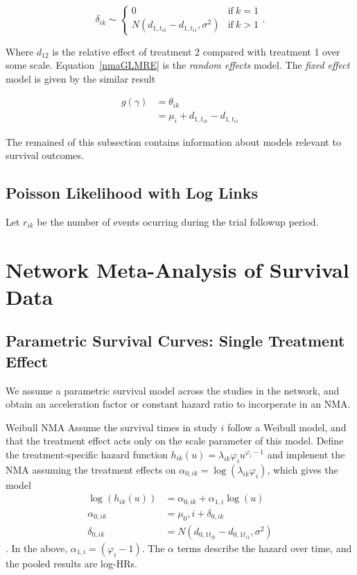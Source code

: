 \[
    \delta_{ik} \sim \begin{cases}
        0 & \text{if} \ k = 1 \\ 
        N(d_{1,t_{ik}} - d_{1,t_{i1}}, \sigma^2) & \text{if} \ k > 1
    \end{cases}.  
\]

Where $d_{12}$ is the relative effect of treatment 2 compared with treatment 1 over some scale. Equation~\ref{nmaGLMRE} is the \textit{random effects} model. The \textit{fixed effect} model is given by the similar result

\begin{align}
    g(\gamma) &= \theta_{ik} \\
              &= \mu_i + d_{1,t_{ik}} - d_{1,t_{i1}}   
\end{align}

The remained of this subsection contains information about models relevant to survival outcomes.

\subsection{Poisson Likelihood with Log Links}
Let $r_{ik}$ be the number of events ocurring during the trial followup period.

\section{Network Meta-Analysis of Survival Data}

\subsection{Parametric Survival Curves: Single Treatment Effect}
We assume a parametric survival model across the studies in the network, and obtain an acceleration factor or constant hazard ratio to incorperate in an NMA. 

\begin{example} {Weibull NMA}
    Assume the survival times in study $i$ follow a Weibull model, and that the treatment effect acts only on the scale parameter of this model. Define the treatment-specific hazard function $h_{ik}(u) = \lambda_{ik}\varphi_iu^{\varphi_i-1}$ and implenent the NMA assuming the treatment effects on $\alpha_{0,ik} = \log(\lambda_{ik}\varphi_i)$, which gives the model 
    \begin{align}
        \log(h_{ik}(u)) &= \alpha_{0,ik} + \alpha_{1,i}\log(u) \\
        \alpha_{0,ik} &= \mu_0,i + \delta_{0,ik} \\
        \delta_{0,ik} &= N(d_{0,1t_{ik}}-d_{0,1t_{i1}}, \sigma^2)
    \end{align}.
    In the above, $\alpha_{1,i} = (\varphi_i - 1)$. The $\alpha$ terms describe the hazard over time, and the pooled results are log-HRs.
\end{example}